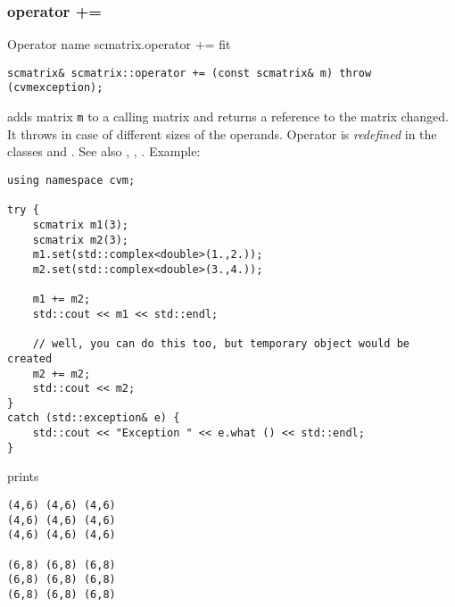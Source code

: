 \subsubsection{operator +=}
Operator%
\pdfdest name {scmatrix.operator +=} fit
\begin{verbatim}
scmatrix& scmatrix::operator += (const scmatrix& m) throw (cvmexception);
\end{verbatim}
adds  matrix \verb"m" to a calling matrix 
and returns a reference to
the matrix changed.
It throws  
in case of different sizes of the operands.
Operator is \emph{redefined} in the classes
and .
See also ,
,
.
Example:
\begin{Verbatim}
using namespace cvm;

try {
    scmatrix m1(3);
    scmatrix m2(3);
    m1.set(std::complex<double>(1.,2.));
    m2.set(std::complex<double>(3.,4.));

    m1 += m2;
    std::cout << m1 << std::endl;

    // well, you can do this too, but temporary object would be created
    m2 += m2; 
    std::cout << m2;
}
catch (std::exception& e) {
    std::cout << "Exception " << e.what () << std::endl;
}
\end{Verbatim}
prints
\begin{Verbatim}
(4,6) (4,6) (4,6)
(4,6) (4,6) (4,6)
(4,6) (4,6) (4,6)

(6,8) (6,8) (6,8)
(6,8) (6,8) (6,8)
(6,8) (6,8) (6,8)
\end{Verbatim}
\newpage




